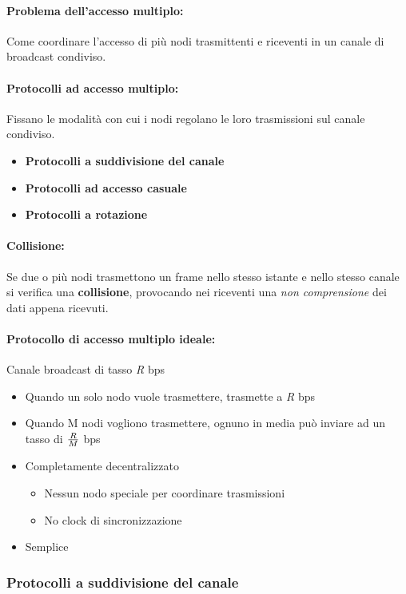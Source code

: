 \documentclass[12pt]{article}
\begin{document}
    \paragraph{Problema dell'accesso multiplo:} Come coordinare l'accesso di più nodi trasmittenti e riceventi in un canale di broadcast condiviso.
    \paragraph{Protocolli ad accesso multiplo:} Fissano le modalità con cui i nodi regolano le loro trasmissioni sul canale condiviso.
    \begin{itemize}
        \item \textbf{Protocolli a suddivisione del canale}
        \item \textbf{Protocolli ad accesso casuale}
        \item \textbf{Protocolli a rotazione}
    \end{itemize}
    \paragraph{Collisione:} Se due o più nodi trasmettono un frame nello stesso istante e nello stesso canale si verifica una \textbf{collisione}, provocando nei riceventi una \textit{non comprensione} dei dati appena ricevuti.

    \paragraph{Protocollo di accesso multiplo ideale:} Canale broadcast di tasso \textit{R} bps
    \begin{itemize}
        \item Quando un solo nodo vuole trasmettere, trasmette a \textit{R} bps
        \item Quando M nodi vogliono trasmettere, ognuno in media può inviare ad un tasso di $R \over M$ bps
        \item Completamente decentralizzato
        \begin{itemize}
            \item Nessun nodo speciale per coordinare trasmissioni
            \item No clock di sincronizzazione
        \end{itemize}
        \item Semplice
    \end{itemize}

    \subsubsection{Protocolli a suddivisione del canale}
        
\end{document}
